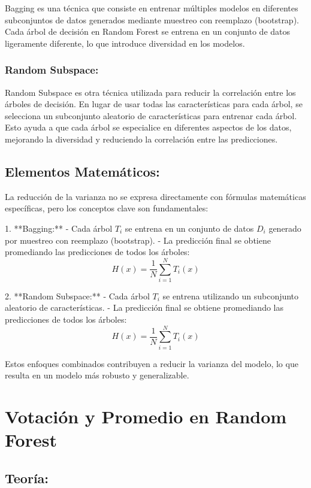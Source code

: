 \documentclass{article}
\begin{document}
Bagging es una técnica que consiste en entrenar múltiples modelos en diferentes subconjuntos de datos generados mediante muestreo con reemplazo (bootstrap). Cada árbol de decisión en Random Forest se entrena en un conjunto de datos ligeramente diferente, lo que introduce diversidad en los modelos.

\subsubsection{Random Subspace:}

Random Subspace es otra técnica utilizada para reducir la correlación entre los árboles de decisión. En lugar de usar todas las características para cada árbol, se selecciona un subconjunto aleatorio de características para entrenar cada árbol. Esto ayuda a que cada árbol se especialice en diferentes aspectos de los datos, mejorando la diversidad y reduciendo la correlación entre las predicciones.

\subsection{Elementos Matemáticos:}

La reducción de la varianza no se expresa directamente con fórmulas matemáticas específicas, pero los conceptos clave son fundamentales:

1. **Bagging:**
    - Cada árbol \(T_i\) se entrena en un conjunto de datos \(D_i\) generado por muestreo con reemplazo (bootstrap).
    - La predicción final se obtiene promediando las predicciones de todos los árboles:
        \[ H(x) = \frac{1}{N} \sum_{i=1}^{N} T_i(x) \]

2. **Random Subspace:**
    - Cada árbol \(T_i\) se entrena utilizando un subconjunto aleatorio de características.
    - La predicción final se obtiene promediando las predicciones de todos los árboles:
        \[ H(x) = \frac{1}{N} \sum_{i=1}^{N} T_i(x) \]

Estos enfoques combinados contribuyen a reducir la varianza del modelo, lo que resulta en un modelo más robusto y generalizable.

\section{Votación y Promedio en Random Forest}

\subsection{Teoría:}
\end{document}
